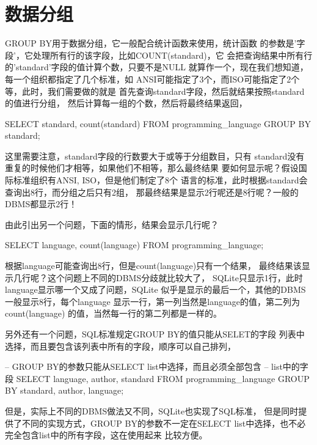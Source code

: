 \documentclass[a4paper,11pt]{article}
\begin{document}
\section[数据分组]{数据分组}
GROUP BY用于数据分组，它一般配合统计函数来使用，统计函数
的参数是'字段'，它处理所有行的该字段，比如COUNT(standard)，它
会把查询结果中所有行的'standard'字段的值计算个数，只要不是NULL
就算作一个，现在我们想知道，每一个组织都指定了几个标准，如
ANSI可能指定了3个，而ISO可能指定了2个等，此时，我们需要做的就是
首先查询standard字段，然后就结果按照standard的值进行分组，
然后计算每一组的个数，然后将最终结果返回，

\begin{sqlcode}
SELECT standard, count(standard) FROM programming_language
    GROUP BY standard;
\end{sqlcode}

这里需要注意，standard字段的行数要大于或等于分组数目，只有
standard没有重复的时候他们才相等，如果他们不相等，那么最终结果
要如何显示呢？假设国际标准组织有ANSI, ISO，但是他们制定了8个
语言的标准，此时根据standard会查询出8行，而分组之后只有2组，
那最终结果是显示2行呢还是8行呢？一般的DBMS都显示2行！

由此引出另一个问题，下面的情形，结果会显示几行呢？

\begin{sqlcode}
SELECT language, count(language) FROM programming_language;
\end{sqlcode}

根据language可能查询出8行，但是count(language)只有一个结果，
最终结果该显示几行呢？这个问题上不同的DBMS分歧就比较大了，
SQLite只显示1行，此时language显示哪一个又成了问题，SQLite
似乎是显示的最后一个，其他的DBMS一般显示8行，每个language
显示一行，第一列当然是language的值，第二列为count(language)
的值，当然每一行的第二列都是一样的。

\vspace{5pt}

另外还有一个问题，SQL标准规定GROUP BY的值只能从SELET的字段
列表中选择，而且要包含该列表中所有的字段，顺序可以自己排列，

\begin{sqlcode}
-- GROUP BY的参数只能从SELECT list中选择，而且必须全部包含
-- list中的字段
SELECT language, author, standard FROM programming_language
    GROUP BY standard, author, language;
\end{sqlcode}

但是，实际上不同的DBMS做法又不同，SQLite也实现了SQL标准，
但是同时提供了不同的实现方式，GROUP BY的参数不一定在SELECT
list中选择，也不必完全包含list中的所有字段，这在使用起来
比较方便。
\end{document}
